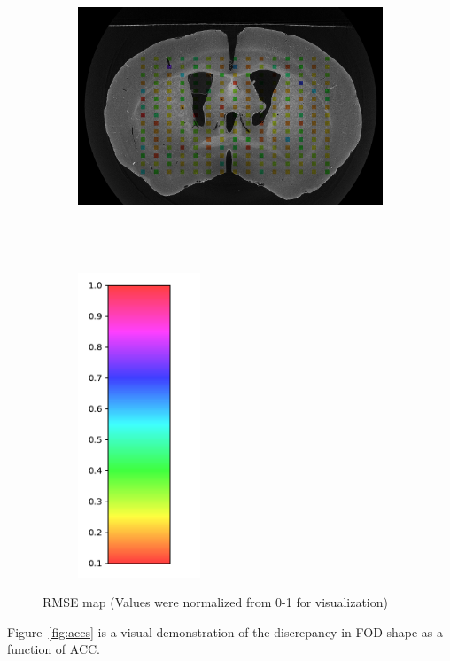 \documentclass[11pt]{article}
\begin{document}
\begin{figure}[H]
  \centering
  \hspace{-5em}
  \begin{subfigure}[b]{0.9\textwidth}
    \centering
    \includegraphics[height=9cm]{figs/rmse}
  \end{subfigure}
  \hspace{-3em}
  \begin{subfigure}[b]{0.05\textwidth}
    \centering
    \includegraphics[height=9.1cm]{figs/cmap}
  \end{subfigure}
  \captionsetup{width=0.9\textwidth}
  \caption{RMSE map (Values were normalized from 0-1 for visualization)}
  \label{fig:rmsemap}
\end{figure}

Figure~\ref{fig:accs} is a visual demonstration of the discrepancy
in FOD shape as a function of ACC. 
\end{document}

